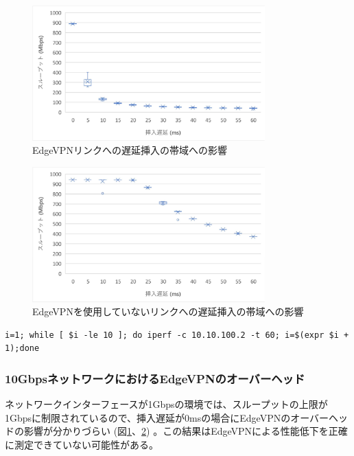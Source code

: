 \begin{figure}[t]
    \centering
    \includegraphics[width=0.8\textwidth,keepaspectratio,clip]{img/bandwidth_withEdgeVPN.pdf}
    \caption{EdgeVPNリンクへの遅延挿入の帯域への影響}
    \label{fig:band_with_edge}
\end{figure}

\begin{figure}[t]
    \centering
    \includegraphics[width=0.8\textwidth,keepaspectratio,clip]{img/bandwidth_withoutEdgeVPN.pdf}
    \caption{EdgeVPNを使用していないリンクへの遅延挿入の帯域への影響}
    \label{fig:band_without_edge}
\end{figure}

\begin{lstlisting}[caption=帯域計測,label=measure_band]
    i=1; while [ $i -le 10 ]; do iperf -c 10.10.100.2 -t 60; i=$(expr $i + 1);done
\end{lstlisting}

\subsubsection{10GbpsネットワークにおけるEdgeVPNのオーバーヘッド}
ネットワークインターフェースが1Gbpsの環境では、スループットの上限が1Gbpsに制限されているので、挿入遅延が0msの場合にEdgeVPNのオーバーヘッドの影響が分かりづらい (図\ref{fig:band_with_edge}、\ref{fig:band_without_edge}) 。この結果はEdgeVPNによる性能低下を正確に測定できていない可能性がある。

